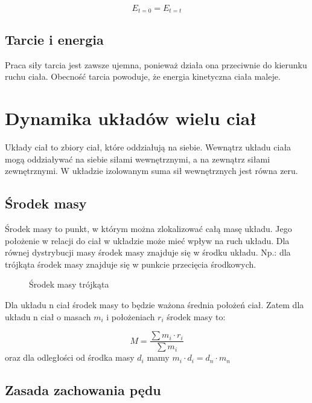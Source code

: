 \documentclass{../notatki}
\begin{document}
$$
E_{t=0} = E_{t=t}
$$

\subsection{Tarcie i energia}

Praca siły tarcia jest zawsze ujemna, ponieważ działa ona przeciwnie do kierunku
ruchu ciała. Obecność tarcia powoduje, że energia kinetyczna ciała maleje.

\section{Dynamika układów wielu ciał}

Układy ciał to zbiory ciał, które oddziałują na siebie. Wewnątrz układu ciała
mogą oddziaływać na siebie siłami wewnętrznymi, a na zewnątrz siłami
zewnętrznymi. W układzie izolowanym suma sił wewnętrznych jest równa zeru.

\subsection{Środek masy}

Środek masy to punkt, w którym można zlokalizować całą masę układu. Jego
położenie w relacji do ciał w układzie może mieć wpływ na ruch układu.
Dla równej dystrybucji masy środek masy znajduje się w środku układu.
Np.: dla trójkąta środek masy znajduje się w punkcie przecięcia środkowych.

\begin{figure*}[ht]
  \centering
  \caption{Środek masy trójkąta}
\end{figure*}
Dla układu n ciał środek masy to będzie ważona średnia położeń ciał. Zatem dla
układu n ciał o masach $m_i$ i położeniach $r_i$ środek masy to:

$$
M = \frac{\sum m_i \cdot r_i}{\sum m_i}
$$
oraz dla odległości od środka masy $d_i$ mamy $m_i \cdot d_i = d_n \cdot m_n$

\subsection{Zasada zachowania pędu}
\end{document}
